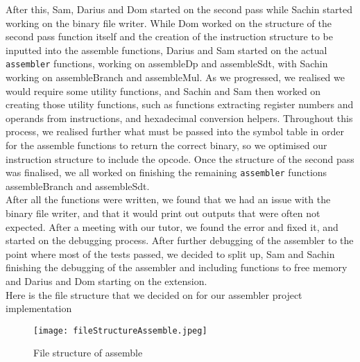 \documentclass [10pt] {article}
\begin{document}
After this, Sam, Darius and Dom started on the second pass while Sachin started working on the binary file writer. While Dom worked on the structure of the second pass function itself and the creation of the instruction structure to be inputted into the assemble functions, Darius and Sam started on the actual {\tt assembler} functions, working on assembleDp and assembleSdt, with Sachin working on assembleBranch and assembleMul. As we progressed, we realised we would require some utility functions, and Sachin and Sam then worked on creating those utility functions, such as functions extracting register numbers and operands from instructions, and hexadecimal conversion helpers. Throughout this process, we realised further what must be passed into the symbol table in order for the assemble functions to return the correct binary, so we optimised our instruction structure to include the opcode. Once the structure of the second pass was finalised, we all worked on finishing the remaining {\tt assembler} functions assembleBranch and assembleSdt.
\vspace {0.3cm}
\\
After all the functions were written, we found that we had an issue with the binary file writer, and that it would print out outputs that were often not expected. After a meeting with our tutor, we found the error and fixed it, and started on the debugging process. After further debugging of the assembler to the point where most of the tests passed, we decided to split up, Sam and Sachin finishing the debugging of the assembler and including functions to free memory and Darius and Dom starting on the extension.
\vspace {0.3cm}
\\
Here is the file structure that we decided on for our assembler project implementation
\vspace {0.3cm}
\\

\begin{figure}[htp]
    \centering
    \texttt{[image: fileStructureAssemble.jpeg]}
    \caption{File structure of assemble}
    \label{fig:file structure assemble}
\end{figure}
\end{document}
